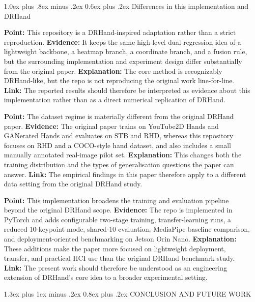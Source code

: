 \documentclass[10pt,letterpaper]{article}
\makeatletter
\renewcommand\section{\@startsection{section}{1}{\z@}%
  {1.3ex plus 1ex minus .2ex}%
  {0.8ex plus .2ex}%
  {\centering\normalfont\small\scshape}}
\renewcommand\subsection{\@startsection{subsection}{2}{\z@}%
  {1.0ex plus .8ex minus .2ex}%
  {0.6ex plus .2ex}%
  {\normalfont\itshape}}
\makeatother
\begin{document}
\subsection{Differences in this implementation and DRHand}

\noindent\textbf{Point:} This repository is a DRHand-inspired adaptation rather than a strict reproduction.
\textbf{Evidence:} It keeps the same high-level dual-regression idea of a lightweight backbone, a heatmap branch, a coordinate branch, and a fusion rule, but the surrounding implementation and experiment design differ substantially from the original paper.
\textbf{Explanation:} The core method is recognizably DRHand-like, but the repo is not reproducing the original work line-for-line.
\textbf{Link:} The reported results should therefore be interpreted as evidence about this implementation rather than as a direct numerical replication of DRHand.

\medskip
\noindent\textbf{Point:} The dataset regime is materially different from the original DRHand paper.
\textbf{Evidence:} The original paper trains on YouTube2D Hands and GANerated Hands and evaluates on STB and RHD, whereas this repository focuses on RHD and a COCO-style hand dataset, and also includes a small manually annotated real-image pilot set.
\textbf{Explanation:} This changes both the training distribution and the types of generalisation questions the paper can answer.
\textbf{Link:} The empirical findings in this paper therefore apply to a different data setting from the original DRHand study.

\medskip
\noindent\textbf{Point:} This implementation broadens the training and evaluation pipeline beyond the original DRHand scope.
\textbf{Evidence:} The repo is implemented in PyTorch and adds configurable two-stage training, transfer-learning runs, a reduced 10-keypoint mode, shared-10 evaluation, MediaPipe baseline comparison, and deployment-oriented benchmarking on Jetson Orin Nano.
\textbf{Explanation:} These additions make the paper more focused on lightweight deployment, transfer, and practical HCI use than the original DRHand benchmark study.
\textbf{Link:} The present work should therefore be understood as an engineering extension of DRHand's core idea to a broader experimental setting.

\section{CONCLUSION AND FUTURE WORK}
\end{document}
